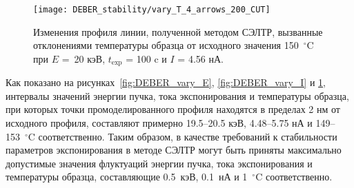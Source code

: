 \begin{figure}[h!]
	\begin{center}
		\texttt{[image: DEBER\_stability/vary\_T\_4\_arrows\_200\_CUT]}
	\end{center}
	\vspace{-0.5em}
	\caption{Изменения профиля линии, полученной методом СЭЛТР, вызванные отклонениями температуры образца от исходного значения 150~$^\circ$C при $E$ =~20 кэВ, $t_\mathrm{exp}$ = 100 c и $I$ = 4.56 нА.}
	\label{fig:DEBER_vary_T}
	\vspace{0.5em}
\end{figure}

Как показано на рисунках~\ref{fig:DEBER_vary_E}, \ref{fig:DEBER_vary_I} и \ref{fig:DEBER_vary_T}, интервалы значений энергии пучка, тока экспонирования и температуры образца, при которых точки промоделированного профиля находятся в пределах 2 нм от исходного профиля, составляют примерно 19.5--20.5 кэВ, 4.48--5.75 нА и 149--153~$^\circ$C соответственно.
Таким образом, в качестве требований к стабильности параметров экспонирования в методе СЭЛТР могут быть приняты максимально допустимые значения флуктуаций энергии пучка, тока экспонирования и температуры образца, составляющие 0.5~кэВ, 0.1~нА и 1~$^\circ$C соответственно.
